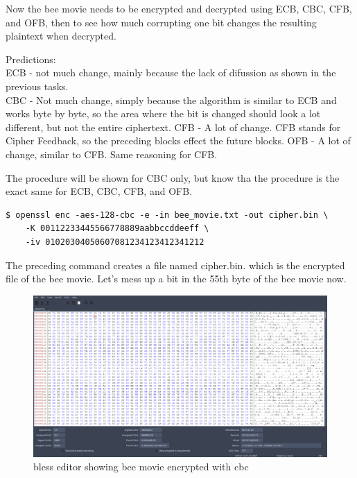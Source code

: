 \documentclass[12pt]{article}
\newcommand\tab[1][0.5cm]{\hspace*{#1}}
\begin{document}
Now the bee movie needs to be encrypted and decrypted using ECB, CBC, CFB, and OFB, then to see how much corrupting one bit changes the resulting plaintext when decrypted. 

Predictions: \\
    \tab ECB - not much change, mainly because the lack of difussion as shown in the previous tasks. \\
    \tab CBC - Not much change, simply because the algorithm is similar to ECB and works byte by byte, so the area where the bit is changed should look a lot different, but not the entire ciphertext.
    \tab CFB - A lot of change. CFB stands for Cipher Feedback, so the preceding blocks effect the future blocks.
    \tab OFB - A lot of change, similar to CFB. Same reasoning for CFB.

The procedure will be shown for CBC only, but know tha the procedure is the exact same for ECB, CBC, CFB, and OFB.

\begin{verbatim}
$ openssl enc -aes-128-cbc -e -in bee_movie.txt -out cipher.bin \
    -K 00112233445566778889aabbccddeeff \
    -iv 01020304050607081234123412341212
\end{verbatim}

The preceding command creates a file named cipher.bin. which is the encrypted file of the bee movie. Let's mess up a bit in the 55th byte of the bee movie now.

\begin{figure}[H]
    \begin{center}
        \includegraphics[scale=0.25]{t5p1.png}
    \end{center}{}
    \caption{bless editor showing bee movie encrypted with cbc}
    \label{fig:t5p1}
\end{figure}
\end{document}
